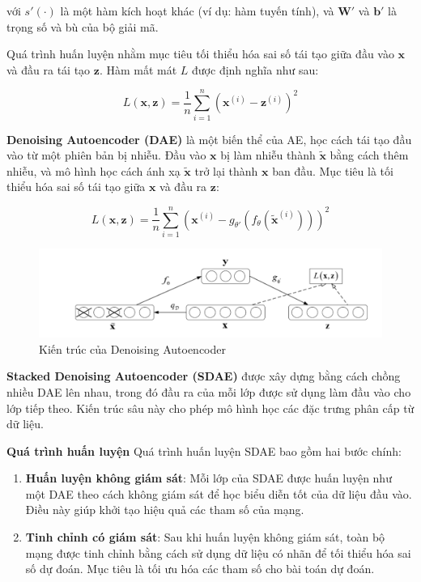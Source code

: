 với $s'(\cdot)$ là một hàm kích hoạt khác (ví dụ: hàm tuyến tính), và $\mathbf{W'}$ và $\mathbf{b'}$ là trọng số và bù của bộ giải mã.

Quá trình huấn luyện nhằm mục tiêu tối thiểu hóa sai số tái tạo giữa đầu vào $\mathbf{x}$ và đầu ra tái tạo $\mathbf{z}$. Hàm mất mát $L$ được định nghĩa như sau:

\begin{equation}
    L(\mathbf{x}, \mathbf{z}) = \frac{1}{n} \sum_{i=1}^n \left( \mathbf{x}^{(i)} - \mathbf{z}^{(i)} \right)^2
\end{equation}


\textbf{Denoising Autoencoder (DAE)} là một biến thể của AE, học cách tái tạo đầu vào từ một phiên bản bị nhiễu. Đầu vào $\mathbf{x}$ bị làm nhiễu thành $\tilde{\mathbf{x}}$ bằng cách thêm nhiễu, và mô hình học cách ánh xạ $\tilde{\mathbf{x}}$ trở lại thành $\mathbf{x}$ ban đầu. Mục tiêu là tối thiểu hóa sai số tái tạo giữa $\mathbf{x}$ và đầu ra $\mathbf{z}$:

\begin{equation}
    L(\mathbf{x}, \mathbf{z}) = \frac{1}{n} \sum_{i=1}^n \left( \mathbf{x}^{(i)} - g_{\theta'}(f_\theta(\tilde{\mathbf{x}}^{(i)})) \right)^2
\end{equation}

\begin{figure}[h!]
    \centering
    \includegraphics[width=\textwidth]{images/chapter5/de.png}
    \caption{Kiến trúc của Denoising Autoencoder}
    \label{fig:dae}
\end{figure}

\textbf{Stacked Denoising Autoencoder (SDAE)} được xây dựng bằng cách chồng nhiều DAE lên nhau, trong đó đầu ra của mỗi lớp được sử dụng làm đầu vào cho lớp tiếp theo. Kiến trúc sâu này cho phép mô hình học các đặc trưng phân cấp từ dữ liệu.

\textbf{Quá trình huấn luyện}
Quá trình huấn luyện SDAE bao gồm hai bước chính:

\begin{enumerate}
    \item \textbf{Huấn luyện không giám sát}: Mỗi lớp của SDAE được huấn luyện như một DAE theo cách không giám sát để học biểu diễn tốt của dữ liệu đầu vào. Điều này giúp khởi tạo hiệu quả các tham số của mạng.
    
    \item \textbf{Tinh chỉnh có giám sát}: Sau khi huấn luyện không giám sát, toàn bộ mạng được tinh chỉnh bằng cách sử dụng dữ liệu có nhãn để tối thiểu hóa sai số dự đoán. Mục tiêu là tối ưu hóa các tham số cho bài toán dự đoán.
\end{enumerate}


